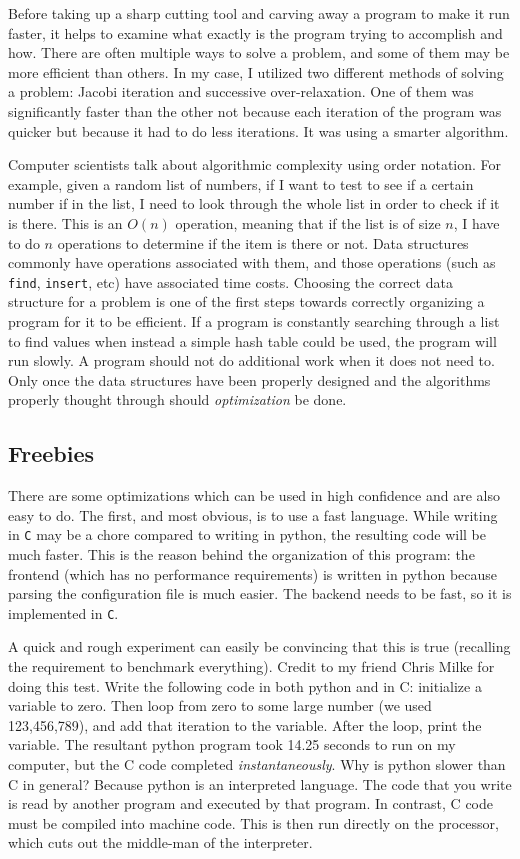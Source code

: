 Before taking up a sharp cutting tool and carving away a program to make it run faster, it helps to examine
what exactly is the program trying to accomplish and how. There are often multiple ways to solve a problem,
and some of them may be more efficient than others. In my case, I utilized two different methods of solving
a problem: Jacobi iteration and successive over-relaxation. One of them was significantly faster than the other
not because each iteration of the program was quicker but because it had to do less iterations. It was using a
smarter algorithm.

Computer scientists talk about algorithmic complexity using order notation. For example, given a random list
of numbers, if I want to test to see if a certain number if in the list, I need to look through the whole
list in order to check if it is there. This is an $O(n)$ operation, meaning that if the list is of size $n$, I
have to do $n$ operations to determine if the item is there or not. Data structures commonly have operations
associated with them, and those operations (such as \texttt{find}, \texttt{insert}, etc) have associated
time costs. Choosing the correct data structure for a problem is one of the first steps towards correctly
organizing a program for it to be efficient. If a program is constantly searching through a list to find
values when instead a simple hash table could be used, the program will run slowly. A program should not
do additional work when it does not need to. Only once the data structures have been properly designed
and the algorithms properly thought through should \textit{optimization} be done.

\subsection{Freebies}

There are some optimizations which can be used in high confidence and are also easy to do.
The first, and most obvious, is to use a fast language. While writing in \texttt{C} may be a chore
compared to writing in python, the resulting code will be much faster. This is the reason behind the
organization of this program: the frontend (which has no performance requirements) is written in
python because parsing the configuration file is much easier. The backend needs to be fast, so it
is implemented in \texttt{C}.

A quick and rough experiment can easily be convincing that this is true (recalling the requirement to benchmark everything). Credit to my friend Chris Milke for doing this test. Write the following
code in both python and in C: initialize a variable to zero. Then loop from zero to some large
number (we used 123,456,789), and add that iteration to the variable. After the loop, print the
variable. The resultant python program took 14.25 seconds to run on my computer, but the C code
completed \textit{instantaneously}. Why is python slower than C in general? Because python is
an interpreted language. The code that you write is read by another program and executed by
that program. In contrast, C code must be compiled into machine code. This is then run directly
on the processor, which cuts out the middle-man of the interpreter.


